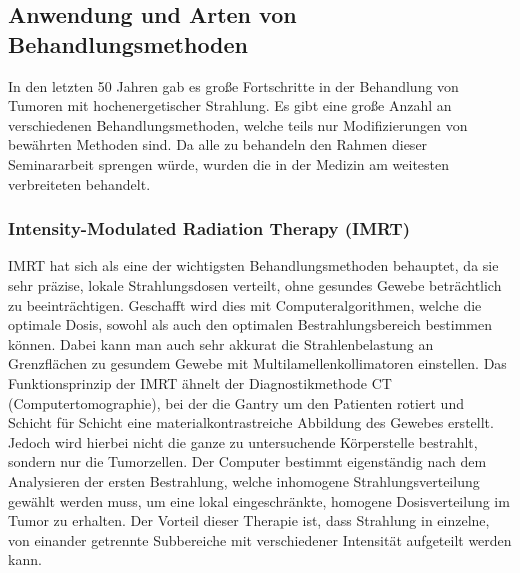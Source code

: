 


\subsection{Anwendung und Arten von Behandlungsmethoden}
In den letzten 50 Jahren gab es große Fortschritte in der Behandlung von Tumoren mit hochenergetischer Strahlung.
Es gibt eine große Anzahl an verschiedenen Behandlungsmethoden, welche teils nur Modifizierungen von bewährten Methoden sind.
Da alle zu behandeln den Rahmen dieser Seminararbeit sprengen würde, wurden die in der Medizin am weitesten verbreiteten behandelt.
\subsubsection{Intensity-Modulated Radiation Therapy (IMRT)}
IMRT hat sich als eine der wichtigsten Behandlungsmethoden behauptet, da sie sehr präzise, lokale Strahlungsdosen verteilt, ohne gesundes Gewebe beträchtlich zu beeinträchtigen.
Geschafft wird dies mit Computeralgorithmen, welche die optimale Dosis, sowohl als auch den optimalen Bestrahlungsbereich bestimmen können.
Dabei kann man auch sehr akkurat die Strahlenbelastung an Grenzflächen zu gesundem Gewebe mit Multilamellenkollimatoren einstellen.
Das Funktionsprinzip der IMRT ähnelt der Diagnostikmethode CT (Computertomographie), bei der die Gantry um den Patienten rotiert und Schicht für Schicht eine materialkontrastreiche Abbildung des Gewebes erstellt.
Jedoch wird hierbei nicht die ganze zu untersuchende Körperstelle bestrahlt, sondern nur die Tumorzellen.
Der Computer bestimmt eigenständig nach dem Analysieren der ersten Bestrahlung, welche inhomogene Strahlungsverteilung gewählt werden muss, um eine lokal eingeschränkte, homogene Dosisverteilung im Tumor zu erhalten. \cite{teh1999intensity}
Der Vorteil dieser Therapie ist, dass Strahlung in einzelne, von einander getrennte Subbereiche mit verschiedener Intensität aufgeteilt werden kann.
